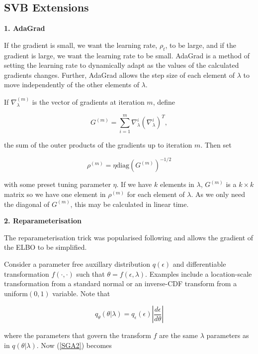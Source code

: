 \documentclass{article}\usepackage[]{graphicx}\usepackage[]{color}
\numberwithin{equation}{section}
\begin{document}
\subsection{SVB Extensions}

\textbf{1. AdaGrad} \newline


If the gradient is small, we want the learning rate, $\rho_t$, to be large, and if the gradient is large, we want the learning rate to be small. AdaGrad \citep{Duchi2011} is a method of setting the learning rate to dynamically adapt as the values of the calculated gradients changes. Further, AdaGrad allows the step size of each element of $\lambda$ to move independently of the other elements of $\lambda$. 

If $\nabla_{\lambda}^{(m)}$ is the vector of gradients at iteration $m$, define

\begin{equation}
G^{(m)} = \sum_{i = 1}^{m} \nabla_{\lambda}^{i} (\nabla_{\lambda}^{i})^T,
\end{equation}

the sum of the outer products of the gradients up to iteration $m$. Then set 

\begin{equation}
\label{adagrad}
\rho^{(m)} = \eta \mbox{diag}(G^{(m)})^{-1/2}
\end{equation}

with some preset tuning parameter $\eta$. If we have $k$ elements in $\lambda$, $G^{(m)}$ is a $k \times k$ matrix so we have one element in $\rho^{(m)}$ for each element of $\lambda$. As we only need the diagonal of $G^{(m)}$, this may be calculated in linear time. \newline

\textbf{2. Reparameterisation} \newline

The reparameterisation trick was popularised following \citet{Kingma2013} and allows the gradient of the ELBO to be simplified.

Consider a parameter free auxillary distribution $q(\epsilon)$ and differentiable transformation $f(\cdot,\cdot)$ such that $\theta = f(\epsilon, \lambda)$. Examples include a location-scale transformation from a standard normal or an inverse-CDF transform from a uniform$(0, 1)$ variable. Note that 

$$q_\theta(\theta | \lambda) = q_\epsilon(\epsilon) \left| \frac{d\epsilon}{d\theta} \right| $$

where the parameters that govern the transform $f$ are the same $\lambda$ parameters as in $q(\theta | \lambda)$. Now (\ref{SGA2}) becomes
\end{document}
